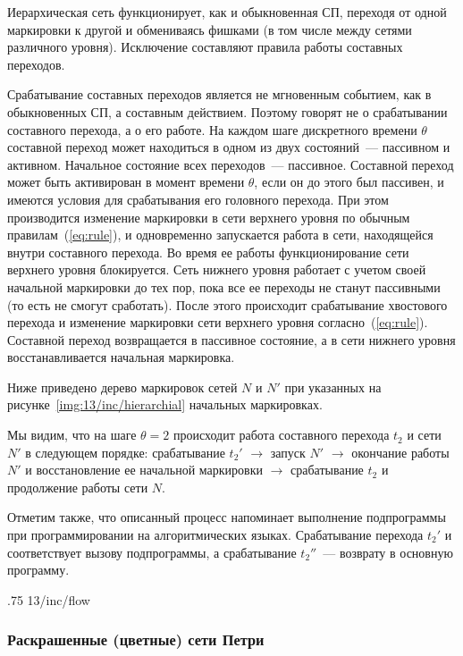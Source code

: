 Иерархическая сеть функционирует, как и обыкновенная СП, переходя от одной маркировки к другой и обмениваясь фишками (в том числе между сетями различного уровня). Исключение составляют правила работы составных переходов.

Срабатывание составных переходов является не мгновенным событием, как в обыкновенных СП, а составным действием. Поэтому говорят не о срабатывании составного перехода, а о его работе. На каждом шаге дискретного времени $\theta$ составной переход может находиться в одном из двух состояний~--- пассивном и активном. Начальное состояние всех переходов~--- пассивное. Составной переход может быть активирован в момент времени $\theta$, если он до этого был пассивен, и имеются условия для срабатывания его головного перехода. При этом производится изменение маркировки в сети верхнего уровня по обычным правилам~(\ref{eq:rule}), и одновременно запускается работа в сети, находящейся внутри составного перехода. Во время ее работы функционирование сети верхнего уровня блокируется. Сеть нижнего уровня работает с учетом своей начальной маркировки до тех пор, пока все ее переходы не станут пассивными (то есть не смогут сработать). После этого происходит срабатывание хвостового перехода и изменение маркировки сети верхнего уровня согласно~(\ref{eq:rule}). Составной переход возвращается в пассивное состояние, а в сети нижнего уровня восстанавливается начальная маркировка.

Ниже приведено дерево маркировок сетей $N$ и $N'$ при указанных на рисунке~\ref{img:13/inc/hierarchial} начальных маркировках.

Мы видим, что на шаге ${\theta = 2}$ происходит работа составного перехода $t_2$ и сети $N'$ в следующем порядке: срабатывание $t_2'$ $\rightarrow$ запуск $N'$ $\rightarrow$ окончание работы $N'$ и восстановление ее начальной маркировки $\rightarrow$ срабатывание $t_2$ и продолжение работы сети $N$.

Отметим также, что описанный процесс напоминает выполнение подпрограммы при программировании на алгоритмических языках. Срабатывание перехода $t_2'$ и соответствует вызову подпрограммы, а срабатывание $t_2''$~--- возврату в основную программу.

\image
{.75\textwidth}
{13/inc/flow}
{}

\subsubsection{Раскрашенные (цветные) сети Петри}

